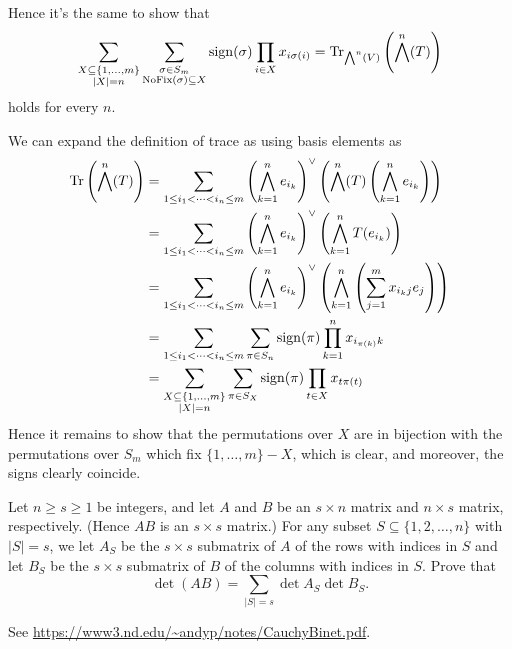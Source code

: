 \begin{problem}
\begin{sol}
		Hence it's the same to show that
		\[
			\sum_{\substack{X \subseteq \{1, \dots, m\} \\ \left\lvert X \right\rvert = n} }
			\sum_{\substack{\sigma \in S_m \\ \operatorname{NoFix}(\sigma) \subseteq X}}
			\operatorname{sign}(\sigma) \prod_{i \in X} x_{i \sigma(i)}
			= \operatorname{Tr}_{\bigwedge^n(V)} \left( \bigwedge^n(T) \right)
		\]
		holds for every $n$.

		We can expand the definition of trace as using basis elements as
		\begin{align*}
			\operatorname{Tr}\left( \bigwedge^n(T) \right)
			&= \sum_{1 \le i_1 < \dots < i_n \le m}
			\left( \bigwedge_{k=1}^n e_{i_k} \right)^\vee
			\left( \bigwedge^n(T) \left( \bigwedge_{k=1}^n e_{i_k} \right) \right) \\
			&= \sum_{1 \le i_1 < \dots < i_n \le m}
			\left( \bigwedge_{k=1}^n e_{i_k} \right)^\vee
			\left(  \bigwedge_{k=1}^n T(e_{i_k}) \right) \\
			&= \sum_{1 \le i_1 < \dots < i_n \le m}
			\left( \bigwedge_{k=1}^n e_{i_k} \right)^\vee
			\left(  \bigwedge_{k=1}^n
			\left( \sum_{j=1}^m x_{i_k j} e_j \right)
			\right) \\
			&= \sum_{1 \le i_1 < \dots < i_n \le m}
			\sum_{\pi \in S_n} \operatorname{sign}(\pi) \prod_{k=1}^n x_{i_{\pi(k)}k} \\
			&= \sum_{\substack{X \subseteq \{1,\dots,m\} \\ \left\lvert X \right\rvert = n}}
			\sum_{\pi \in S_X} \operatorname{sign}(\pi) \prod_{t \in X} x_{t \pi(t)}
		\end{align*}
		Hence it remains to show that the permutations over $X$
		are in bijection with the permutations over $S_m$ which fix $\{1, \dots, m\} - X$,
		which is clear, and moreover, the signs clearly coincide.
	\end{sol}
\end{problem}

\begin{problem}
	\onechili
	Let $n \ge s \ge 1$ be integers,
	and let $A$ and $B$ be an $s \times n$ matrix and $n \times s$ matrix, respectively.
	(Hence $AB$ is an $s \times s$ matrix.)
	For any subset $S \subseteq \{1, 2, \dots, n\}$ with $|S| = s$,
	we let $A_S$ be the $s \times s$ submatrix of $A$ of the rows with indices in $S$
	and let $B_S$ be the $s \times s$ submatrix of $B$ of the columns with indices in $S$.
	Prove that
	\[ \det(AB) = \sum_{|S| = s} \det A_S \det B_S. \]
	\begin{sol}
		See \url{https://www3.nd.edu/~andyp/notes/CauchyBinet.pdf}.
	\end{sol}
\end{problem}
